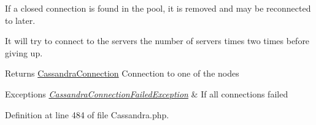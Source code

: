 If a closed connection is found in the pool, it is removed and may be reconnected to later.

It will try to connect to the servers the number of servers times two times before giving up.

\begin{DoxyReturn}{Returns}
\hyperlink{classCassandraConnection}{CassandraConnection} Connection to one of the nodes 
\end{DoxyReturn}

\begin{DoxyExceptions}{Exceptions}
{\em \hyperlink{classCassandraConnectionFailedException}{CassandraConnectionFailedException}} & If all connections failed \\
\hline
\end{DoxyExceptions}


Definition at line 484 of file Cassandra.php.


